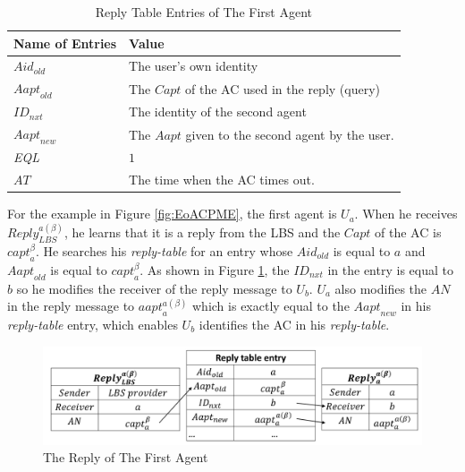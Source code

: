 \begin{table} [hbtp]
\caption{Reply Table Entries of The First Agent}
\label{table:RTEFirstAgt}
\centering
\tabulinesep=2mm
\begin{tabu} to 135 mm {|X[1,c]|X[3,l]|} \hline 
Name of Entries & Value \\ \hline 
${Aid}_{old}$ & The user's own identity \\ \hline 
${Aapt}_{old}$ & The $Capt$ of the AC used in the reply (query) \\ \hline 
${ID}_{nxt}$ & The identity of the second agent \\ \hline 
${Aapt}_{new}$ & The $Aapt$ given to the second agent by the user. \\ \hline 
\textit{EQL} & $1$ \\ \hline 
$AT$ & The time when the AC times out. \\ \hline 
\end{tabu}
\end{table}

For the example in Figure \ref{fig:EoACPME}, the first agent is $U_a$. When he receives ${Reply}^{a\left(\beta\right)}_{LBS}$, he learns that it is a reply from the LBS and the $Capt$ of the AC is ${capt}^{\beta}_a$. He searches his \textit{reply-table} for an entry whose ${Aid}_{old}$ is equal to $a$ and ${Aapt}_{old}$ is equal to ${capt}^{\beta }_a$. As shown in Figure \ref{fig:ReplyOfFirstAgent}, the ${ID}_{nxt}$ in the entry is equal to $b$ so he modifies the receiver of the reply message to $U_b$. $U_a$ also modifies the $AN$ in the reply message to ${aapt}^{a\left(\beta\right)}_a$ which is exactly equal to the ${Aapt}_{new}$ in his \textit{reply-table} entry, which enables $U_b$ identifies the AC in his \textit{reply-table}. 

\begin{figure} [H]
\centering 
\includegraphics[width=6.0in]{figures/FIG_4_7_The_Reply_of_The_First_Agent.png}
\caption{The Reply of The First Agent} 
\label{fig:ReplyOfFirstAgent} %
\end{figure}

